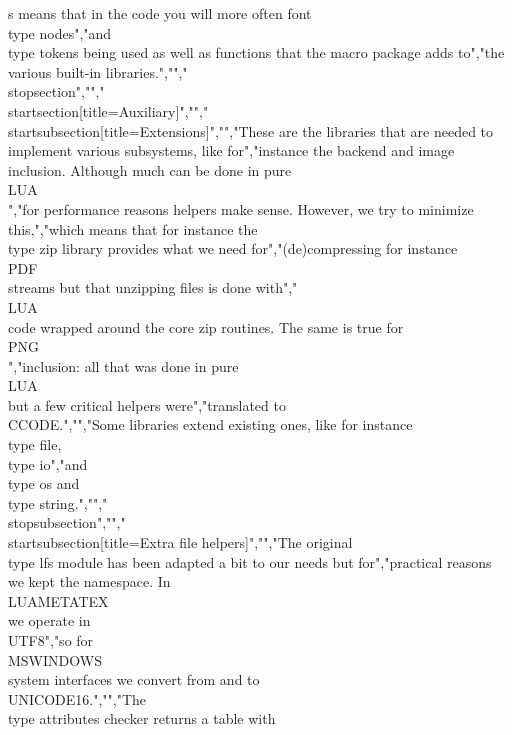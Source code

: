 s means that in the code you will more often font \\type {nodes}","and \\type {tokens} being used as well as functions that the macro package adds to","the various built-in libraries.","","\\stopsection","","\\startsection[title={Auxiliary}]","","\\startsubsection[title=Extensions]","","These are the libraries that are needed to implement various subsystems, like for","instance the backend and image inclusion. Although much can be done in pure \\LUA\\","for performance reasons helpers make sense. However, we try to minimize this,","which means that for instance the \\type {zip} library provides what we need for","(de)compressing for instance \\PDF\\ streams but that unzipping files is done with","\\LUA\\ code wrapped around the core zip routines. The same is true for \\PNG\\","inclusion: all that was done in pure \\LUA\\ but a few critical helpers were","translated to \\CCODE.","","Some libraries extend existing ones, like for instance \\type {file}, \\type {io}","and \\type {os} and \\type {string}.","","\\stopsubsection","","\\startsubsection[title=Extra file helpers]","","The original \\type {lfs} module has been adapted a bit to our needs but for","practical reasons we kept the namespace. In \\LUAMETATEX\\ we operate in \\UTF8","so for \\MSWINDOWS\\ system interfaces we convert from and to \\UNICODE16.","","The \\type {attributes} checker returns a table with 